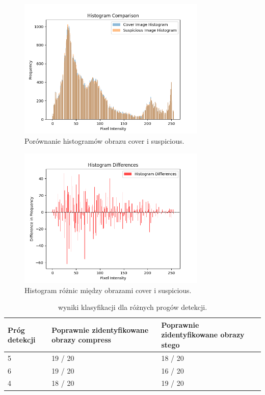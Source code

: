 \begin{figure}[ht!]
    \centering
    \includegraphics[width=0.8\textwidth]{./img/cover_histogram.png}
    \caption{Porównanie histogramów obrazu cover i suspicious.}
    \label{fig:histogram_comparison}
\end{figure}

\begin{figure}[ht!]
    \centering
    \includegraphics[width=0.8\textwidth]{./img/diff_histogram.png}
    \caption{Histogram różnic między obrazami cover i suspicious.}
    \label{fig:histogram_diff}
\end{figure}

\pagebreak

\begin{table}[ht!]
    \centering
    \begin{tabular}{|p{3cm}|p{5cm}|p{5cm}|}
    \toprule
        \textbf{Próg detekcji} & \textbf{Poprawnie zidentyfikowane obrazy compress} & \textbf{Poprawnie zidentyfikowane obrazy stego} \\ \midrule
    5 & 19 / 20 & 18 / 20 \\
    6 & 19 / 20 & 16 / 20 \\
    4 & 18 / 20 & 19 / 20 \\ \bottomrule
    \end{tabular}
    \caption{wyniki klasyfikacji dla różnych progów detekcji.}
    \label{tab:classification_results}
    \end{table}

